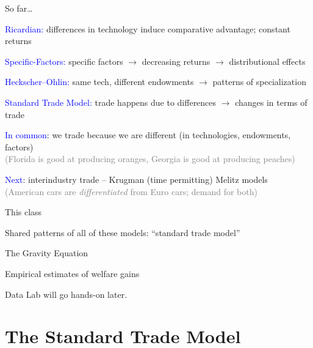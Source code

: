 \documentclass[notes,11pt, aspectratio=169, xcolor=table]{beamer}
\newcommand{\blue}[1]{\textcolor{blue}{#1}}
\newenvironment{wideitemize}{\itemize\addtolength{\itemsep}{10pt}}{\enditemize}
\begin{document}
\begin{frame}{So far\ldots}
\begin{wideitemize}
  \item \blue{Ricardian:} differences in technology induce comparative advantage; constant returns
  \item<2-> \blue{Specific-Factors:} specific factors $\rightarrow$ decreasing returns $\rightarrow$ distributional effects
  \item<3-> \blue{Heckscher–Ohlin:} same tech, different endowments $\rightarrow$ patterns of specialization
  \item<4-> \blue{Standard Trade Model:} trade happens due to differences $\rightarrow$ changes in terms of trade 
  \item<5-> \blue{In common}: we trade because we are different (in technologies, endowments, factors) \\
  \textcolor{gray}{(Florida is good at producing oranges, Georgia is good at producing peaches)}
  \item<6-> \blue{Next}: interindustry trade -- Krugman (time permitting) Melitz models\\
  \textcolor{gray}{(American cars are \textit{differentiated} from Euro cars; demand for both)}
\end{wideitemize}
\end{frame}

\begin{frame}{This class}
\begin{wideitemize}
    \item Shared patterns of all of these models: ``standard trade model''
    \item The Gravity Equation
    \item Empirical estimates of welfare gains
    \item Data Lab will go hands-on later.
\end{wideitemize}
\end{frame}

\section{The Standard Trade Model}
\end{document}
